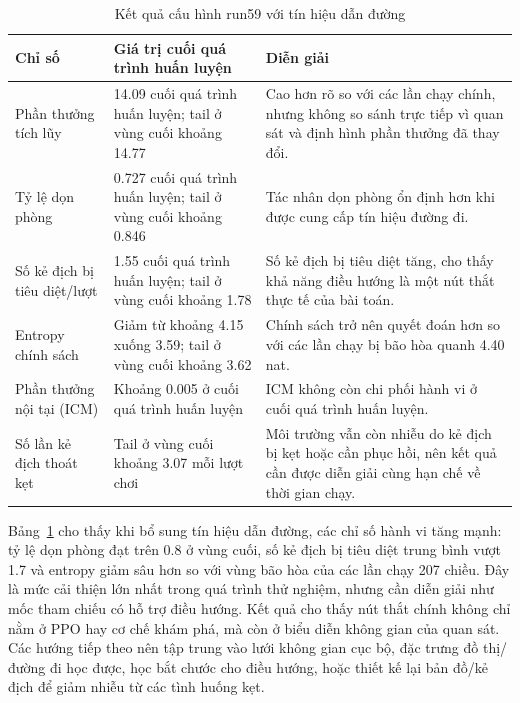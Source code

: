\begin{table}[H]
    \centering
    \small
    \caption{Kết quả cấu hình run59 với tín hiệu dẫn đường}
    \label{tab:run59_bfs_assisted}
    \begin{tabular}{|p{4.1cm}|p{3.7cm}|p{6.4cm}|}
        \hline
        \textbf{Chỉ số} & \textbf{Giá trị cuối quá trình huấn luyện} & \textbf{Diễn giải} \\
        \hline
        Phần thưởng tích lũy & 14.09 cuối quá trình huấn luyện; tail ở vùng cuối khoảng 14.77 & Cao hơn rõ so với các lần chạy chính, nhưng không so sánh trực tiếp vì quan sát và định hình phần thưởng đã thay đổi. \\
        \hline
        Tỷ lệ dọn phòng & 0.727 cuối quá trình huấn luyện; tail ở vùng cuối khoảng 0.846 & Tác nhân dọn phòng ổn định hơn khi được cung cấp tín hiệu đường đi. \\
        \hline
        Số kẻ địch bị tiêu diệt/lượt & 1.55 cuối quá trình huấn luyện; tail ở vùng cuối khoảng 1.78 & Số kẻ địch bị tiêu diệt tăng, cho thấy khả năng điều hướng là một nút thắt thực tế của bài toán. \\
        \hline
        Entropy chính sách & Giảm từ khoảng 4.15 xuống 3.59; tail ở vùng cuối khoảng 3.62 & Chính sách trở nên quyết đoán hơn so với các lần chạy bị bão hòa quanh 4.40 nat. \\
        \hline
        Phần thưởng nội tại (ICM) & Khoảng 0.005 ở cuối quá trình huấn luyện & ICM không còn chi phối hành vi ở cuối quá trình huấn luyện. \\
        \hline
        Số lần kẻ địch thoát kẹt & Tail ở vùng cuối khoảng 3.07 mỗi lượt chơi & Môi trường vẫn còn nhiễu do kẻ địch bị kẹt hoặc cần phục hồi, nên kết quả cần được diễn giải cùng hạn chế về thời gian chạy. \\
        \hline
    \end{tabular}
\end{table}

Bảng~\ref{tab:run59_bfs_assisted} cho thấy khi bổ sung tín hiệu dẫn đường, các chỉ số hành vi tăng mạnh: tỷ lệ dọn phòng đạt trên 0.8 ở vùng cuối, số kẻ địch bị tiêu diệt trung bình vượt 1.7 và entropy giảm sâu hơn so với vùng bão hòa của các lần chạy 207 chiều. Đây là mức cải thiện lớn nhất trong quá trình thử nghiệm, nhưng cần diễn giải như mốc tham chiếu có hỗ trợ điều hướng. Kết quả cho thấy nút thắt chính không chỉ nằm ở PPO hay cơ chế khám phá, mà còn ở biểu diễn không gian của quan sát. Các hướng tiếp theo nên tập trung vào lưới không gian cục bộ, đặc trưng đồ thị/đường đi học được, học bắt chước cho điều hướng, hoặc thiết kế lại bản đồ/kẻ địch để giảm nhiễu từ các tình huống kẹt.

